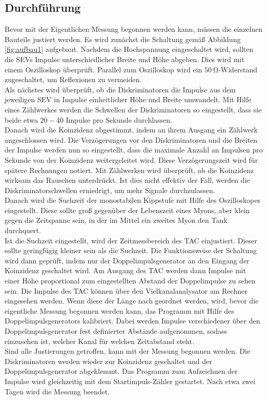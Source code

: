\subsection{Durchführung}
\label{sec:durchführung}

Bevor mit der Eigentlichen Messung begonnen werden kann, müssen die einzelnen Bauteile justiert werden.
Es wird zunächst die Schaltung gemäß Abbildung \ref{fig:aufbau1} aufgebaut.
Nachdem die Hochspannung eingeschaltet wird, sollten die SEVs Impulse unterschiedlicher Breite und Höhe abgeben.
Dies wird mit einem Oszilloskop überprüft.
Parallel zum Oszilloskop wird ein $\SI{50}{\ohm}$-Widerstand zugeschaltet, um Reflexionen zu vermeiden.\\
Als nächstes wird überprüft, ob die Diskriminatoren die Impulse aus dem jeweiligen SEV in Impulse einheitlicher Höhe und Breite umwandelt.
Mit Hilfe eines Zählwerkes werden die Schwellen der Diskriminatoren so eingestellt, dass sie beide etwa $20-40$ Impulse pro Sekunde durchlassen.\\
Danach wird die Koinzidenz abgestimmt, indem an ihrem Ausgang ein Zählwerk angeschlossen wird.
Die Verzögerungen vor den Diskriminatoren und die Breiten der Impulse werden nun so eingestellt, dass die maximale Anzahl an Impulsen pro Sekunde von der Koinzidenz weitergeleitet wird.
Diese Verzögerungszeit wird für spätere Rechnungen notiert.
Mit Zählwerken wird überprüft, ob die Koinzidenz wirksam das Rauschen unterdrückt.
Ist dies nicht effektiv der Fall, werden die Diskriminatorschwellen erniedrigt, um mehr Signale durchzulassen.\\
Danach wird die Suchzeit der monostabilen Kippstufe mit Hilfe des Oszilloskopes eingestellt.
Diese sollte groß gegenüber der Lebenszeit eines Myons, aber klein gegen die Zeitspanne sein, in der im Mittel ein zweites Myon den Tank durchquert.\\
Ist die Suchzeit eingestellt, wird der Zeitmessbereich des TAC einjustiert.
Dieser sollte geringfügig kleiner sein als die Suchzeit.
Die Funktionsweise der Schaltung wird dann geprüft, indem nur der Doppelimpulsgenerator an den Eingang der Koinzidenz geschaltet wird.
Am Ausgang des TAC werden dann Impulse mit einer Höhe proportional zum eingestellten Abstand der Doppelimpulse zu sehen sein.
Die Impulse des TAC können über den Vielkanalanalysator am Rechner eingesehen werden.
Wenn diese der Länge nach geordnet werden, wird, bevor die eigentliche Messung begonnen werden kann, das Programm mit Hilfe des Doppelimpulsgenerators kalibriert.
Dabei werden Impulse verschiedener über den Doppelimpulsgenerator fest definierter Abstände aufgenommen, sodass einzusehen ist, welcher Kanal für welchen Zeitabstand steht.\\
Sind alle Justierungen getroffen, kann mit der Messung begonnen werden.
Die Diskriminatoren werden wieder zur Koinzidenz geschaltet und der Doppelimpulsgenerator abgeklemmt.
Das Programm zum Aufzeichnen der Impulse wird gleichzeitig mit dem Startimpuls-Zähler gestartet.
Nach etwa zwei Tagen wird die Messung beendet.
